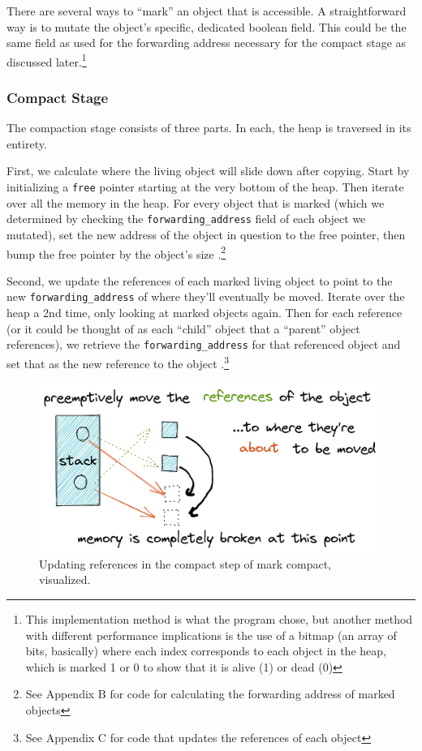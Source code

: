 \documentclass[index]{subfiles}
\begin{document}
There are several ways to ``mark'' an object that is accessible\cite[Chapter~3]{gc_handbook}. A straightforward way is to mutate the object's specific, dedicated boolean field. This could be the same field as used for the forwarding address necessary for the compact stage as discussed later\cite[Chapter~1]{gc_handbook}.\footnote{This implementation method is what the program chose, but another method with different performance implications is the use of a bitmap (an array of bits, basically) where each index corresponds to each object in the heap, which is marked 1 or 0 to show that it is alive (1) or dead (0)\cite[Chapter~3]{gc_handbook}}

\subsubsection{Compact Stage}

The compaction stage consists of three parts. In each, the heap is traversed in its entirety.

First, we calculate where the living object will slide down after copying. Start by initializing a \verb+free+ pointer starting at the very bottom of the heap. Then iterate over all the memory in the heap. For every object that is marked (which we determined by checking the \verb+forwarding_address+ field of each object we mutated), set the new address of the object in question to the free pointer, then bump the free pointer by the object's size \cites[Chapter~3]{gc_handbook}[Sections~3.3--3.5]{redhat_openjdk}.\footnote{See Appendix B for code for calculating the forwarding address of marked objects}

Second, we update the references of each marked living object to point to the new \verb+forwarding_address+ of where they'll eventually be moved. Iterate over the heap a 2nd time, only looking at marked objects again. Then for each reference (or it could be thought of as each ``child'' object that a ``parent'' object references), we retrieve the \verb+forwarding_address+ for that referenced object and set that as the new reference to the object \cites[Chapter 3]{gc_handbook}[Sec.~3.4]{redhat_openjdk}.\footnote{See Appendix C for code that updates the references of each object}

\begin{figure}[H]
    \centering
    \includegraphics[scale=0.3]{pics/update-references.png}
    \caption{Updating references in the compact step of mark compact, visualized.}
\end{figure}
\end{document}
